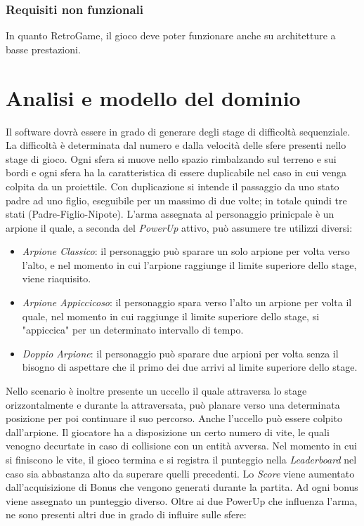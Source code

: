 \documentclass[a4paper,12pt]{report}
\begin{document}
\subsubsection{Requisiti non funzionali}
In quanto RetroGame, il gioco deve poter funzionare anche su architetture a basse prestazioni.

\section{Analisi e modello del dominio}
Il software dovrà essere in grado di generare degli stage di difficoltà sequenziale. La difficoltà è determinata dal numero e dalla velocità delle sfere presenti nello stage di gioco. Ogni sfera si muove nello spazio rimbalzando sul terreno e sui bordi e ogni sfera ha la caratteristica di essere duplicabile nel caso in cui venga colpita da un proiettile. Con duplicazione si intende il passaggio da uno stato padre ad uno figlio, eseguibile per un massimo di due volte; in totale quindi tre stati (Padre-Figlio-Nipote). L'arma assegnata al personaggio prinicpale è un arpione il quale, a seconda del \emph{PowerUp} attivo, può assumere tre utilizzi diversi:
\begin{itemize}
    \item \emph{Arpione Classico}: il personaggio può sparare un solo arpione per volta verso l'alto, e nel momento in cui l'arpione raggiunge il limite superiore dello stage, viene riaquisito. 
    \item \emph{Arpione Appiccicoso}: il personaggio spara verso l'alto un arpione per volta il quale, nel momento in cui raggiunge il limite superiore dello stage, si "appiccica" per un determinato intervallo di tempo.
    \item\emph{Doppio Arpione}: il personaggio può sparare due arpioni per volta senza il bisogno di aspettare che il primo dei due arrivi al limite superiore dello stage.
\end{itemize}
Nello scenario è inoltre presente un uccello il quale attraversa lo stage orizzontalmente e durante la attraversata, può planare verso una determinata posizione per poi continuare il suo percorso. Anche l'uccello può essere colpito dall'arpione. 
Il giocatore ha a disposizione un certo numero di vite, le quali venogno decurtate in caso di collisione con un entità avversa. Nel momento in cui si finiscono le vite, il gioco termina e si registra il punteggio nella \emph{Leaderboard} nel caso sia abbastanza alto da superare quelli precedenti.
Lo \emph{Score} viene aumentato dall'acquisizione di Bonus che vengono generati durante la partita. Ad ogni bonus viene assegnato un punteggio diverso. Oltre ai due PowerUp che influenza l'arma, ne sono presenti altri due in grado di influire sulle sfere:
\end{document}

